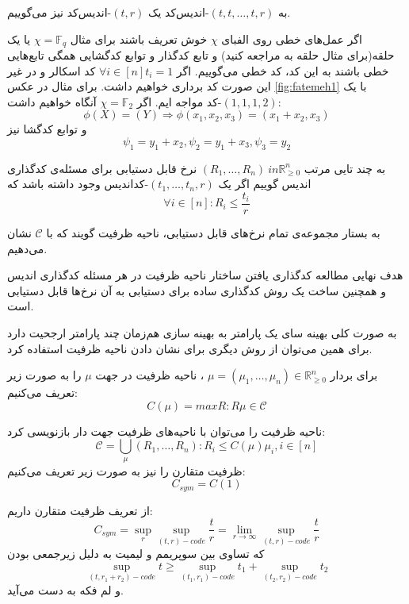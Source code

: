 	به 
	$(t, t, \ldots, t, r)$-اندیس‌کد
	یک
	$(t, r)$-اندیس‌کد
	نیز می‌گوییم.
	
	اگر عمل‌های خطی روی الفبای
	$\chi$
	خوش تعریف باشند برای مثال
	$\chi = \mathbb{F}_q$
	یا یک حلقه(برای مثال حلقه به 
	\cite{Connelly2018}
	مراجعه کنید) و تابع کدگذار و توابع کدگشایی همگی تابع‌هایی خطی باشند به این کد، کد خطی می‌گوییم. اگر 
	$\forall i \in [n] t_i = 1$
	کد اسکالر و در غیر این صورت کد برداری خواهیم داشت. برای مثال در عکس 
	\ref{fig:fatemeh1}
	با یک 
	$(1, 1, 1, 2)$-کد
	مواجه ایم. اگر
	$\chi = \mathbb{F}_2$
	آنگاه خواهیم داشت:
	$$\phi(X) = (Y) \Rightarrow \phi(x_1, x_2, x_3) = (x_1 + x_2, x_3)$$
	و توابع کدگشا نیز
	$$\psi_1 = y_1 + x_2, \psi_2 = y_1 + x_3, \psi_3 = y_2$$
	\begin{definition}
		به چند تایی مرتب
		$(R_1, \ldots, R_n) \ in \mathbb{R}_{\geqslant 0}^n$
		نرخ قابل دستیابی برای مسئله‌ی کدگذاری اندیس گوییم اگر یک 
		$(t_1, \ldots, t_n, r)$-کداندیس
		وجود داشته باشد که
		$$\forall i \in [n]: R_i \leq \frac{t_i}{r}$$
		
		به بستار مجموعه‌ی تمام نرخ‌های قابل دستیابی، ناحیه ظرفیت گویند که با
		$\mathscr{C}$
		نشان می‌دهیم.
	\end{definition}
	
	هدف نهایی  مطالعه کدگذاری یافتن ساختار ناحیه ظرفیت در هر مسئله کدگذاری اندیس و همچنین ساخت یک روش کدگذاری ساده برای دستیابی به آن نرخ‌ها قابل دستیابی است.
	
	به صورت کلی بهینه سای یک پارامتر به بهینه سازی هم‌زمان چند پارامتر ارجحیت دارد برای همین می‌توان از روش دیگری برای نشان دادن ناحیه ظرفیت استفاده کرد.
	\begin{definition}
	برای بردار
	$\mu = (\mu_1, \ldots, \mu_n) \in \mathbb{R}_{\geqslant 0}^n $
	، ناحیه ظرفیت در جهت
	$\mu$
	را به صورت زیر تعریف می‌کنیم:
	$$C(\mu) = max {R: R \mu \in \mathscr{C}}$$
\end{definition}

\begin{remark}
	ناحیه ظرفیت را می‌توان با ناحیه‌های ظرفیت جهت دار بازنویسی کرد:
	$$\mathscr{C} = \bigcup\limits_{\mu} {(R_1, \ldots, R_n): R_i \leq C(\mu) \mu_i, i \in [n]}$$
	ظرفیت متقارن را نیز به صورت زیر تعریف می‌کنیم:
	$$C_{sym} = C(1) $$
\end{remark}

از تعریف ظرفیت متقارن داریم:
$$C_{sym}= \sup\limits_{r} \sup_{(t, r)-code} \dfrac{t}{r} = \lim\limits_{r \rightarrow \infty} \sup_{(t, r)-code} \dfrac{t}{r} $$
که تساوی بین سوپریمم و لیمیت به دلیل زیرجمعی بودن
$$\sup_{(t, r_1 + r_2)-code} t \geqslant \sup_{(t_1, r_1)-code} t_1 + \sup_{(t_2, r_2)-code} t_2$$
و لم فکه
\cite{fekke}
به دست می‌آید.

